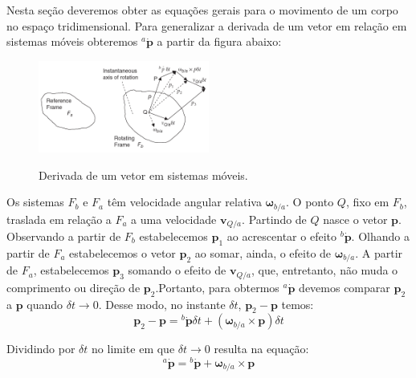 Nesta seção deveremos obter as equações gerais para o movimento de um corpo no espaço tridimensional. Para generalizar a derivada de um vetor em relação em sistemas móveis obteremos \(^{a}\dot{\mathbf{p}}\) a partir da figura abaixo:
\begin{figure}[H]
    \centering
    \includegraphics[width=0.5\textwidth, keepaspectratio]{figuras/figure1.4-1.png}\label{fig1.4-1}
    \caption{Derivada de um vetor em sistemas móveis.}
\end{figure}

Os sistemas \(F_{b}\) e \(F_{a}\) têm velocidade angular relativa \(\mathbf{\omega}_{b/a}\). O ponto \(Q\), fixo em \(F_{b}\), traslada em relação a \(F_{a}\) a uma velocidade \(\mathbf{v}_{Q/a}\). Partindo de  \(Q\) nasce o vetor \(\mathbf{p}\). Observando a partir de \(F_{b}\) estabelecemos \(\mathbf{p}_{1}\) ao acrescentar o efeito \({^b\dot{\mathbf{p}}}\). Olhando a partir de \(F_{a}\) estabelecemos o vetor  \(\mathbf{p}_{2}\) ao somar, ainda, o efeito de \(\mathbf{\omega}_{b/a}\). A partir de \(F_{a}\), estabelecemos \(\mathbf{p}_{3}\) somando o efeito de \(\mathbf{v}_{Q/a}\), que, entretanto, não muda o comprimento ou direção de \(\mathbf{p}_{2}\).Portanto, para obtermos \(^{a}\dot{\mathbf{p}}\) devemos  comparar \(\mathbf{p}_{2}\) a \(\mathbf{p}\) quando \(\delta t \rightarrow 0\). Desse modo, no instante \(\delta t\), \(\mathbf{p}_{2} \!-\! \mathbf{p}\) temos:
\begin{equation*}
    \mathbf{p}_{2} - \mathbf{p} = {^{b}\dot{\mathbf{p}}} \delta t + \left( \mathbf{\omega}_{b/a} \! \times \!\mathbf{p} \right) \delta t
\end{equation*}

Dividindo por \(\delta t\) no limite em que \(\delta t \rightarrow 0\) resulta na equação\footnotemark{}:
\begin{equation} \label{eq:1.4-2}
    {^{a}\dot{\mathbf{p}}} = {^{b}\dot{\mathbf{p}}} + {\mathbf{\omega}_{b/a} \! \times \!\mathbf{p}}
\end{equation}


